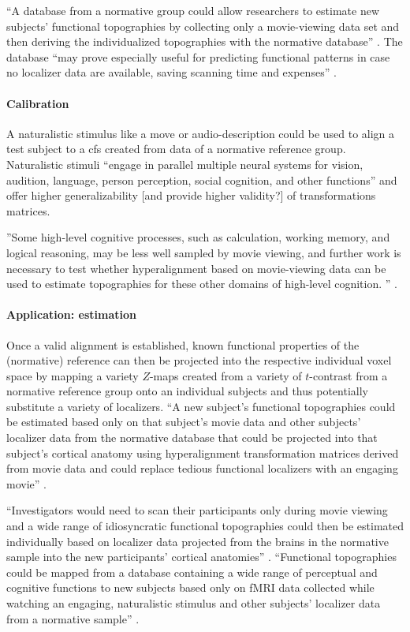 %
``A database from a normative group could allow researchers to estimate new
subjects' functional topographies by collecting only a movie-viewing data set
and then deriving the individualized topographies with the normative database''
\citep{jiahui2020predicting}.
%
The database ``may prove especially useful for predicting functional patterns in
case no localizer data are available, saving scanning time and expenses''
\citep{rosenke2021probabilistic}.


\paragraph{Calibration}
%
A naturalistic stimulus like a move or audio-description could be used to align
a test subject to a \ac{cfs} created from data of a normative reference group.
%
Naturalistic stimuli ``engage in parallel multiple neural systems for vision,
audition, language, person perception, social cognition, and other functions''
\citep{jiahui2020predicting} and offer higher generalizability [and provide
higher validity?] of transformations matrices.

%
''Some high-level cognitive processes, such as calculation, working memory, and
logical reasoning, may be less well sampled by movie viewing, and further work
is necessary to test whether hyperalignment based on movie-viewing data can be
used to estimate topographies for these other domains of high-level cognition.
'' \citep{jiahui2020predicting}.


\paragraph{Application: estimation}

%
Once a valid alignment is established, known functional properties of the
(normative) reference can then be projected into the respective individual voxel
space by mapping a variety $Z$-maps created from a variety of $t$-contrast from
a normative reference group onto an individual subjects and thus potentially
substitute a variety of localizers.
%
``A new subject's functional topographies could be estimated based only on that
subject's movie data and other subjects' localizer data from the normative
database that could be projected into that subject's cortical anatomy using
hyperalignment transformation matrices derived from movie data and could replace
tedious functional localizers with an engaging movie''
\citep{jiahui2020predicting}.

%
``Investigators would need to scan their participants only during movie viewing
and a wide range of idiosyncratic functional topographies could then be
estimated individually based on localizer data projected from the brains in the
normative sample into the new participants' cortical anatomies''
\citep{jiahui2020predicting}.
%
``Functional topographies could be mapped from a database containing a wide
range of perceptual and cognitive functions to new subjects based only on fMRI
data collected while watching an engaging, naturalistic stimulus and other
subjects' localizer data from a normative sample'' \citep{jiahui2020predicting}.

